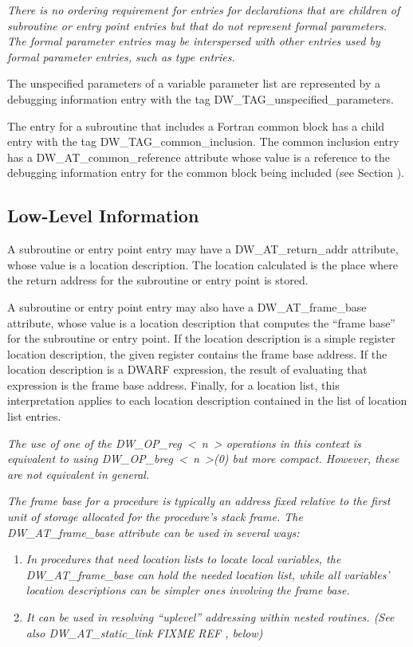 \textit{There is no ordering requirement for entries for declarations
that are children of subroutine or entry point entries but
that do not represent formal parameters. The formal parameter
entries may be interspersed with other entries used by formal
parameter entries, such as type entries.}

The unspecified parameters of a variable parameter list are
represented by a debugging information entry with the tag
DW\_TAG\_unspecified\_parameters.

The entry for a subroutine that includes a Fortran common block
has a child entry with the tag 
DW\-\_TAG\-\_common\-\_inclusion. The
common inclusion entry has a 
DW\-\_AT\-\_common\-\_reference attribute
whose value is a reference to the debugging information entry
for the common block being included 
(see Section ).

\subsection{Low-Level Information}
\label{chap:lowlevelinformation}

A subroutine or entry point entry may have a DW\_AT\_return\_addr
attribute, whose value is a location description. The location
calculated is the place where the return address for the
subroutine or entry point is stored.

A subroutine or entry point entry may also have a
DW\_AT\_frame\_base attribute, whose value is a location
description that computes the “frame base” for the
subroutine or entry point. If the location description is
a simple register location description, the given register
contains the frame base address. If the location description is
a DWARF expression, the result of evaluating that expression
is the frame base address. Finally, for a location list,
this interpretation applies to each location description
contained in the list of location list entries.

\textit{The use of one of the DW\_OP\_reg~\textless~n~\textgreater 
operations in this
context is equivalent to using 
DW\_OP\_breg~\textless~n~\textgreater(0) 
but more
compact. However, these are not equivalent in general.}

\textit{The frame base for a procedure is typically an address fixed
relative to the first unit of storage allocated for the
procedure’s stack frame. The DW\_AT\_frame\_base attribute
can be used in several ways:}

\begin{enumerate}[1.]
\item \textit{In procedures that need location lists to locate local
variables, the DW\_AT\_frame\_base can hold the needed location
list, while all variables’ location descriptions can be
simpler ones involving the frame base.}

\item \textit{It can be used in resolving ``up\dash level'' addressing
within nested routines. 
(See also DW\_AT\_static\_link FIXME REF , below)}
\end{enumerate}

